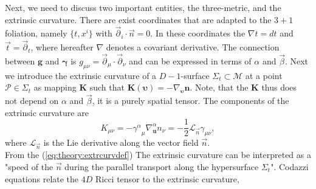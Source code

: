 Next, we need to discuss two important entities, 
the three-metric, and the extrinsic curvature.
%
There are exist coordinates that are adapted to the $3+1$ foliation, namely $\{t, x^i\}$ 
with $\vec{\partial}_i \cdot \vec{n} = 0$. 
In these coordinates the $\nabla t = dt$ and $\vec{t} = \vec{\partial}_t$, 
where hereafter $\nabla$ denotes a covariant derivative.
%
The connection between $\boldsymbol{g}$ and $\boldsymbol{\gamma}$ is $g_{\mu\nu}=\vec{\partial}_{\mu}\cdot\vec{\partial}_{\nu} $ 
and can be expressed in terms of $\alpha$ and $\vec{\beta}$.
%
Next we introduce the extrinsic curvature of a $D-1$-surface $\Sigma_t\subset\mathcal{M}$
at a point $\mathcal{P}\in\Sigma_t$ as mapping $\boldsymbol{K}$ such that $\boldsymbol{K}(\boldsymbol{\upsilon})=-\nabla_{\boldsymbol{\upsilon}}\boldsymbol{n}$. 
Note, that the $\boldsymbol{K}$ thus does not depend on 
$\alpha$ and $\vec{\beta}$, it is a purely spatial tensor. 
The components of the extrinsic curvature are
%
\begin{equation}
K_{\mu\nu} = -{\gamma^{\alpha}}_{\mu}\nabla_{\boldsymbol{u}}^{\alpha} n_{\nu} = -\frac{1}{2}\mathcal{L}_{\vec{n}}\gamma_{\mu\nu},
\label{eq:theory:extrcurvdef}
\end{equation}
%
where $\mathcal{L}_{\vec{n}}$ is the Lie derivative along the vector field $\vec{n}$. \\
From the (\ref{eq:theory:extrcurvdef}) 
%
The extrinsic curvature can be 
interpreted as a "speed of the $\vec{n}$ during the parallel 
transport along the hypersurface $\Sigma_t$".
%
Codazzi equations relate the $4D$ Ricci tensor to the extrinsic curvature,

